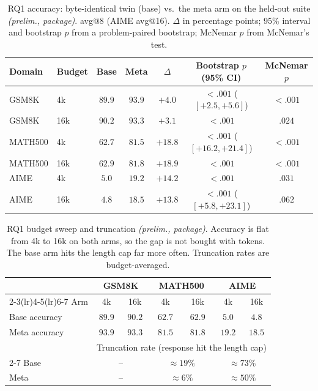 \begin{table}[t]
\caption{RQ1 accuracy: byte-identical twin (base) vs.\ the meta arm on the
held-out suite \emph{(prelim., package)}. avg@8 (AIME avg@16). $\Delta$ in
percentage points; 95\% interval and bootstrap $p$ from a problem-paired
bootstrap; McNemar $p$ from McNemar's test.}
\label{tab:t1}
\begin{center}
\small
\begin{tabular}{llccccc}
\toprule
Domain & Budget & Base & Meta & $\Delta$ & Bootstrap $p$ (95\% CI) & McNemar $p$ \\
\midrule
GSM8K   & 4k  & $89.9$ & $\mathbf{93.9}$ & $+4.0$  & $<.001$ ($[+2.5,+5.6]$)  & $<.001$ \\
GSM8K   & 16k & $90.2$ & $\mathbf{93.3}$ & $+3.1$  & $<.001$                  & $.024$  \\
MATH500 & 4k  & $62.7$ & $\mathbf{81.5}$ & $+18.8$ & $<.001$ ($[+16.2,+21.4]$)& $<.001$ \\
MATH500 & 16k & $62.9$ & $\mathbf{81.8}$ & $+18.9$ & $<.001$                  & $<.001$ \\
AIME    & 4k  & $5.0$  & $\mathbf{19.2}$ & $+14.2$ & $<.001$                  & $.031$  \\
AIME    & 16k & $4.8$  & $\mathbf{18.5}$ & $+13.8$ & $<.001$ ($[+5.8,+23.1]$) & $.062$  \\
\bottomrule
\end{tabular}
\end{center}
\end{table}

\begin{table}[t]
\caption{RQ1 budget sweep and truncation \emph{(prelim., package)}. Accuracy
is flat from 4k to 16k on both arms, so the gap is not bought with tokens.
The base arm hits the length cap far more often. Truncation rates are
budget-averaged.}
\label{tab:t1b}
\begin{center}
\small
\begin{tabular}{lcccccc}
\toprule
 & \multicolumn{2}{c}{GSM8K} & \multicolumn{2}{c}{MATH500} & \multicolumn{2}{c}{AIME} \\
\cmidrule(lr){2-3}\cmidrule(lr){4-5}\cmidrule(lr){6-7}
Arm & 4k & 16k & 4k & 16k & 4k & 16k \\
\midrule
Base accuracy & $89.9$ & $90.2$ & $62.7$ & $62.9$ & $5.0$  & $4.8$  \\
Meta accuracy & $93.9$ & $93.3$ & $81.5$ & $81.8$ & $19.2$ & $18.5$ \\
\midrule
 & \multicolumn{6}{c}{Truncation rate (response hit the length cap)} \\
\cmidrule(lr){2-7}
Base & \multicolumn{2}{c}{--} & \multicolumn{2}{c}{$\approx19\%$} & \multicolumn{2}{c}{$\approx73\%$} \\
Meta & \multicolumn{2}{c}{--} & \multicolumn{2}{c}{$\approx6\%$}  & \multicolumn{2}{c}{$\approx50\%$} \\
\bottomrule
\end{tabular}
\end{center}
\end{table}


